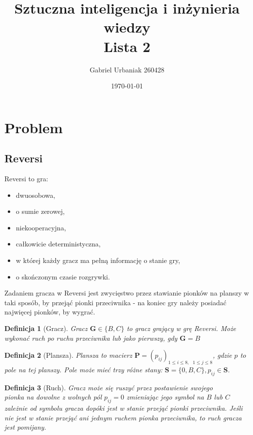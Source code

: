 \documentclass[12pt, a4paper]{article}
\title{Sztuczna inteligencja i inżynieria wiedzy \\ Lista 2}
\author{Gabriel Urbaniak 260428}
\date{\today}
\newtheorem{definition}{Definicja}
\begin{document}
\maketitle

\section{Problem}

\subsection{Reversi}
Reversi to gra:
\begin{itemize}
    \item dwuosobowa,
    \item o sumie zerowej,
    \item niekooperacyjna,
    \item całkowicie deterministyczna,
    \item w której każdy gracz ma pełną informację o stanie gry,
    \item o skończonym czasie rozgrywki.
\end{itemize}

Zadaniem gracza w Reversi jest zwycięstwo przez stawianie pionków na planszy w taki sposób, by przejąć pionki przeciwnika -
na koniec gry należy posiadać najwięcej pionków, by wygrać.

\begin{definition}[Gracz]
    Gracz $\boldsymbol{G} \in \{B, C\}$ to gracz grający w grę Reversi.
    Może wykonać ruch po ruchu przeciwnika lub jako pierwszy, gdy $\boldsymbol{G} = B$
\end{definition}

\begin{definition}[Plansza]
    Plansza to macierz $\boldsymbol{P} = (p_{ij})_{1 \le i \le 8,\text{ } 1 \le j \le 8}$, gdzie $p$ to pole na tej planszy.
    Pole może mieć trzy różne stany: $ \boldsymbol{S} = \{0, B, C\}, p_{ij} \in \boldsymbol{S} $.
\end{definition}

\begin{definition}[Ruch]
    Gracz może się ruszyć przez postawienie swojego \\ pionka na dowolne z wolnych pól $p_{ij} = 0$
    zmieniając jego symbol na $B$ lub $C$ zależnie od symbolu gracza dopóki jest w stanie przejąć pionki przeciwnika.
    Jeśli nie jest w stanie przejąć ani jednym ruchem pionka przeciwnika, to ruch gracza jest pomijany.
\end{definition}
\end{document}
